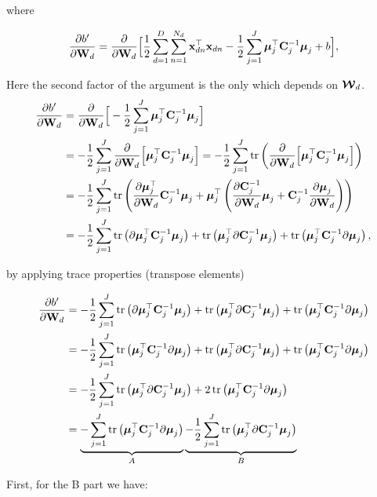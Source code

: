 	where
	
	\begin{align}
	\frac{\partial b'}{\dWjIn} = \frac{\partial}{\dWjIn}\Big[ \frac{1}{2} \sum_{d=1}^{D}\sum_{n=1}^{N_d}\indobj^\top\indobj -\frac{1}{2}\sum_{j=1}^{J}\muJ^\top\Cin^{-1}\muJ +b \Big],
	\end{align}
	
	Here the second factor of the argument is the only which depends on $\projMat$.
	\begin{align}
	\frac{\partial b'}{\dWjIn} &= \frac{\partial}{\dWjIn}\Big[-\frac{1}{2}\sum_{j=1}^{J}\muJ^\top\Cin^{-1}\muJ \Big] \notag \\
	&=-\frac{1}{2}\sum_{j=1}^{J}\frac{\partial}{\dWjIn}\Big[\muJ^\top\Cin^{-1}\muJ \Big] =-\frac{1}{2}\sum_{j=1}^{J}\tr\left(\frac{\partial}{\dWjIn}\Big[\muJ^\top\Cin^{-1}\muJ \Big]\right) \notag \\
	&=-\frac{1}{2}\sum_{j=1}^{J}\tr\left(\frac{\partial \muJ^\top}{\dWjIn}\Cin^{-1}\muJ + \muJ^\top\left(\frac{\partial \Cin^{-1}}{\dWjIn}\muJ+\Cin^{-1}\frac{\partial \muJ}{\dWjIn}\right)\right) \notag \\
	& = -\frac{1}{2}\sum_{j=1}^{J} \tr\left(\partial \muJ^\top\Cin^{-1}\muJ\right) + \tr\left( \muJ^\top\partial\Cin^{-1}\muJ\right) + \tr\left( \muJ^\top\Cin^{-1}\partial\muJ\right),
	\end{align}
	
	by applying trace properties (transpose elements)
	
	\begin{align}
	\frac{\partial b'}{\dWjIn} &= -\frac{1}{2}\sum_{j=1}^{J} \tr\left(\partial \muJ^\top\Cin^{-1}\muJ\right) + \tr\left( \muJ^\top\partial\Cin^{-1}\muJ\right) + \tr\left( \muJ^\top\Cin^{-1}\partial\muJ\right) \notag \\
	&=  -\frac{1}{2}\sum_{j=1}^{J} \tr\left( \muJ^\top\Cin^{-1}\partial\muJ\right) + \tr\left( \muJ^\top\partial\Cin^{-1}\muJ\right) + \tr\left( \muJ^\top\Cin^{-1}\partial\muJ\right) \notag \\
	&= -\frac{1}{2}\sum_{j=1}^{J} \tr\left( \muJ^\top\partial\Cin^{-1}\muJ\right) + 2\tr\left( \muJ^\top\Cin^{-1}\partial\muJ\right) \notag\\
	&=  \underbrace{-\sum_{j=1}^{J}\tr\left( \muJ^\top\Cin^{-1}\partial\muJ\right)}_{A} \underbrace{-\frac{1}{2}\sum_{j=1}^{J} \tr\left( \muJ^\top\partial\Cin^{-1}\muJ\right)}_{B} 
	\end{align}
	
	First, for the B part we have:
	
